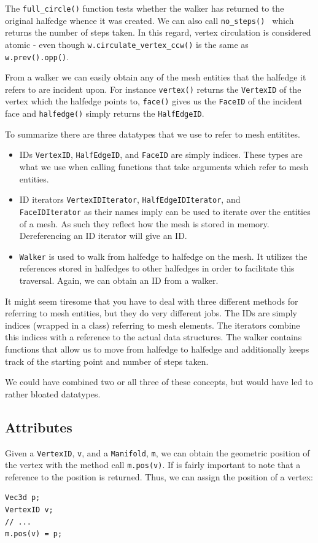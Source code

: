 \documentclass[a4paper]{article}
\begin{document}
The \texttt{full\_circle()} function tests whether the walker has returned to the original halfedge whence it was created. We can also call  \texttt{no\_steps() } which returns the number of steps taken. In this regard, vertex circulation is considered atomic - even though \texttt{w.circulate\_vertex\_ccw()} is the same as  \texttt{w.prev().opp()}.

From a walker we can easily obtain any of the mesh entities that the halfedge it refers to are incident upon. For instance \texttt{vertex()} returns the \texttt{VertexID} of the vertex which the halfedge points to, \texttt{face()} gives us the \texttt{FaceID} of the incident face and \texttt{halfedge()} simply returns the \texttt{HalfEdgeID}.

To summarize there are three datatypes that we use to refer to mesh entitites.
\begin{itemize}
\item IDs \texttt{VertexID}, \texttt{HalfEdgeID}, and \texttt{FaceID} are simply indices. These types are what we use when calling functions that take arguments which refer to mesh entities. 
\item ID iterators \texttt{VertexIDIterator}, \texttt{HalfEdgeIDIterator}, and\\ \texttt{FaceIDIterator} as their names imply can be used to iterate over the entities of a mesh. As such they reflect how the mesh is stored in memory. Dereferencing an ID iterator will give an ID. 
\item \texttt{Walker} is used to walk from halfedge to halfedge on the mesh. It utilizes the references stored in halfedges to other halfedges in order to facilitate this traversal. Again, we can obtain an ID from a walker.
\end{itemize}
It might seem tiresome that you have to deal with three different methods for referring to mesh entities, but they do very different jobs. The IDs are simply indices (wrapped in a class) referring to mesh elements. The iterators combine this indices with a reference to the actual data structures. The walker contains functions that allow us to move from halfedge to halfedge and additionally keeps track of the starting point and number of steps taken.

We could have combined two or all three of these concepts, but would have led to rather bloated datatypes.

\subsection{Attributes}
Given a \texttt{VertexID},  \texttt{v}, and a \texttt{Manifold}, \texttt{m}, we can obtain the geometric position of the vertex with the method call \texttt{m.pos(v)}. If is fairly important to note that a reference to the position is returned. Thus, we can assign the position of a vertex:
\begin{verbatim}
Vec3d p;
VertexID v;
// ...
m.pos(v) = p;
\end{verbatim}
\end{document}
